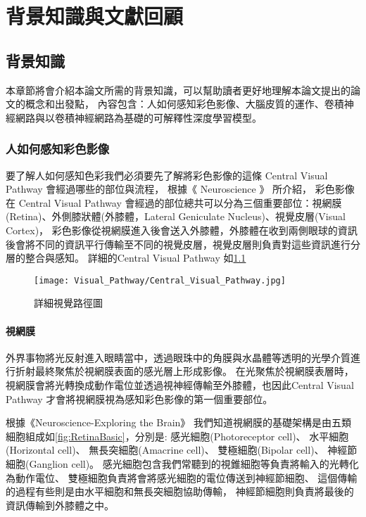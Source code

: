 \documentclass[class=NCU_thesis, crop=false]{standalone}
\begin{document}
\chapter{背景知識與文獻回顧}
\section{背景知識}

本章節將會介紹本論文所需的背景知識，可以幫助讀者更好地理解本論文提出的論文的概念和出發點，
內容包含：人如何感知彩色影像、大腦皮質的運作、卷積神經網路與以卷積神經網路為基礎的可解釋性深度學習模型。

\subsection{人如何感知彩色影像}

要了解人如何感知色彩我們必須要先了解將彩色影像的這條 Central Visual Pathway 會經過哪些的部位與流程，
根據《 Neuroscience 》 \cite{Purves2004Neuroscience3E}所介紹，
彩色影像在 Central Visual Pathway 會經過的部位總共可以分為三個重要部位：視網膜(Retina)、外側膝狀體(外膝體，Lateral Geniculate Nucleus)、視覺皮層(Visual Cortex)，
彩色影像從視網膜進入後會送入外膝體，外膝體在收到兩側眼球的資訊後會將不同的資訊平行傳輸至不同的視覺皮層，視覺皮層則負責對這些資訊進行分層的整合與感知。
詳細的Central Visual Pathway 如\cref{fig:Central_Visual_Pathway}

\begin{figure}[H]
  \centering
  \texttt{[image: Visual\_Pathway/Central\_Visual\_Pathway.jpg]}
  \caption{詳細視覺路徑圖~\cite{Purves2004Neuroscience3E}}
  \label{fig:Central_Visual_Pathway}
\end{figure}

\subsubsection{視網膜}

外界事物將光反射進入眼睛當中，透過眼珠中的角膜與水晶體等透明的光學介質進行折射最終聚焦於視網膜表面的感光層上形成影像。
在光聚焦於視網膜表層時，視網膜會將光轉換成動作電位並透過視神經傳輸至外膝體，也因此Central Visual Pathway 才會將視網膜視為感知彩色影像的第一個重要部位。

根據《Neuroscience-Exploring the Brain》\cite{bear2016neuroscience}
我們知道視網膜的基礎架構是由五類細胞組成如\cref{fig:RetinaBasic}，分別是: 感光細胞(Photoreceptor cell)、 水平細胞(Horizontal cell)、 無長突細胞(Amacrine cell)、 雙極細胞(Bipolar cell)、 神經節細胞(Ganglion cell)。 感光細胞包含我們常聽到的視錐細胞等負責將輸入的光轉化為動作電位、 雙極細胞負責將會將感光細胞的電位傳送到神經節細胞、
這個傳輸的過程有些則是由水平細胞和無長突細胞協助傳輸，
神經節細胞則負責將最後的資訊傳輸到外膝體之中。
\end{document}
